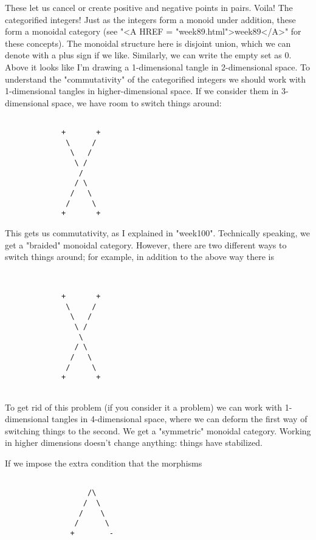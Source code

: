 These let us cancel or create positive and negative points in pairs.
Voila!  The categorified integers!  Just as the integers form a monoid
under addition, these form a monoidal category (see "<A HREF = "week89.html">week89</A>" for these
concepts).  The monoidal structure here is disjoint union, which we can
denote with a plus sign if we like.  Similarly, we can write the empty 
set as 0.  
Above it looks like I'm drawing a 1-dimensional tangle in 2-dimensional
space.  To understand the "commutativity" of the categorified integers
we should work with 1-dimensional tangles in higher-dimensional space.
If we consider them in 3-dimensional space, we have room to switch
things around:

\begin{verbatim}

             +       +
              \     /
               \   /
                \ /
                 /
                / \
               /   \
              /     \
             +       +
\end{verbatim}
    
This gets us commutativity, as I explained in "week100".  Technically
speaking, we get a "braided" monoidal category.  However, there are two
different ways to switch things around; for example, in addition to the
above way there is 

\begin{verbatim}


             +       +
              \     /
               \   /
                \ /
                 \
                / \
               /   \
              /     \
             +       +
 
\end{verbatim}
    
To get rid of this problem (if you consider it a problem) we can work
with 1-dimensional tangles in 4-dimensional space, where we can deform
the first way of switching things to the second.  We get a "symmetric"
monoidal category.  Working in higher dimensions doesn't change
anything: things have stabilized.

If we impose the extra condition that the morphisms


\begin{verbatim}

                   /\
                  /  \
                 /    \
                /      \
               +        -

\end{verbatim}
    
